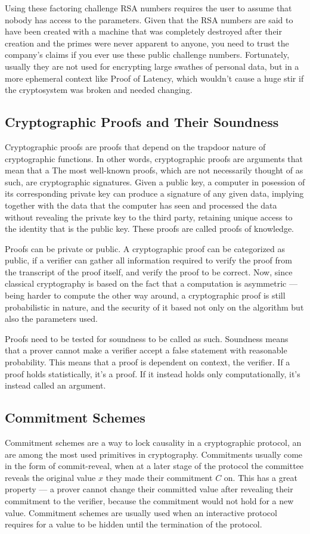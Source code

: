 Using these factoring challenge RSA numbers requires the user to assume that nobody has access to the parameters. Given that the RSA numbers are said to have been created with a machine that was completely destroyed after their creation and the primes were never apparent to anyone, you need to trust the company's claims if you ever use these public challenge numbers. Fortunately, usually they are not used for encrypting large swathes of personal data, but in a more ephemeral context like Proof of Latency, which wouldn't cause a huge stir if the cryptosystem was broken and needed changing.

\subsection{Cryptographic Proofs and Their Soundness}
Cryptographic proofs are proofs that depend on the trapdoor nature of cryptographic functions. In other words, cryptographic proofs are arguments that mean that a  The most well-known proofs, which are not necessarily thought of as such, are cryptographic signatures. Given a public key, a computer in posession of its corresponding private key can produce a signature of any given data, implying together with the data that the computer has seen and processed the data without revealing the private key to the third party, retaining unique access to the identity that is the public key. These proofs are called proofs of knowledge.

Proofs can be private or public. A cryptographic proof can be categorized as public, if a verifier can gather all information required to verify the proof from the transcript of the proof itself, and verify the proof to be correct. Now, since classical cryptography is based on the fact that a computation is asymmetric --- being harder to compute the other way around, a cryptographic proof is still probabilistic in nature, and the security of it based not only on the algorithm but also the parameters used.

Proofs need to be tested for soundness to be called as such. Soundness means that a prover cannot make a verifier accept a false statement with reasonable probability. This means that a proof is dependent on context, the verifier. If a proof holds statistically, it's a proof. If it instead holds only computationally, it's instead called an argument.


\subsection{Commitment Schemes}
Commitment schemes are a way to lock causality in a cryptographic protocol, an are among the most used primitives in cryptography. Commitments usually come in the form of commit-reveal, when at a later stage of the protocol the committee reveals the original value \(x\) they made their commitment \(C\) on. This has a great property --- a prover cannot change their committed value after revealing their commitment to the verifier, because the commitment would not hold for a new value. Commitment schemes are usually used when an interactive protocol requires for a value to be hidden until the termination of the protocol.

